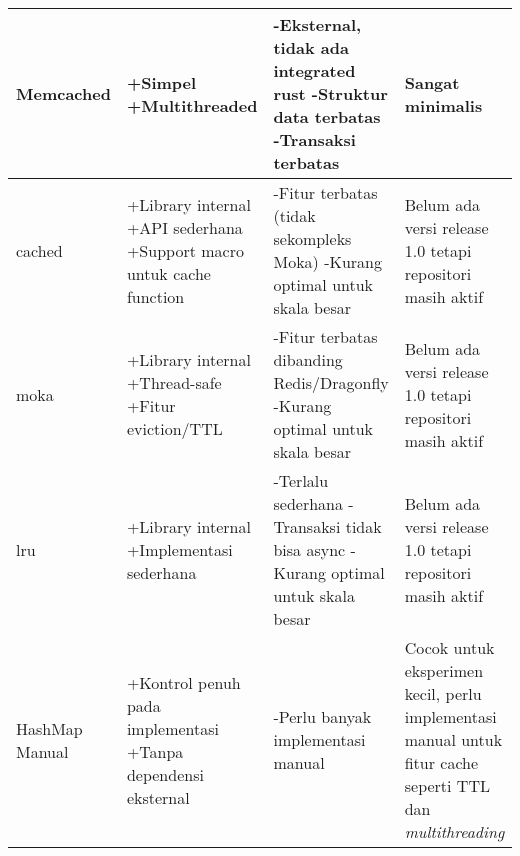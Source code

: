 \begin{table}[h]
{\begin{tabular}{|l|p{5cm}|p{5cm}|p{3cm}|}
			Memcached                 & +Simpel \newline +Multithreaded                                                              & -Eksternal, tidak ada integrated rust \newline -Struktur data terbatas \newline -Transaksi terbatas                                                                          & Sangat minimalis                                                                                                  \\ \hline
			cached                    & +Library internal \newline +API sederhana \newline  +Support macro untuk cache function      & -Fitur terbatas (tidak sekompleks Moka) \newline -Kurang optimal untuk skala besar                                                                                           & Belum ada versi release 1.0 tetapi repositori masih aktif                                                         \\ \hline
			moka                      & +Library internal \newline +Thread-safe \newline +Fitur eviction/TTL                         & -Fitur terbatas dibanding Redis/Dragonfly \newline -Kurang optimal untuk skala besar                                                                                         & Belum ada versi release 1.0 tetapi repositori masih aktif                                                         \\ \hline
			lru                       & +Library internal \newline +Implementasi sederhana                                           & -Terlalu sederhana \newline -Transaksi tidak bisa async \newline -Kurang optimal untuk skala besar                                                                           & Belum ada versi release 1.0 tetapi repositori masih aktif                                                         \\ \hline
			HashMap Manual            & +Kontrol penuh pada implementasi \newline +Tanpa dependensi eksternal                        & -Perlu banyak implementasi manual                                                                                                                                            & Cocok untuk eksperimen kecil, perlu implementasi manual untuk fitur cache seperti TTL dan \textit{multithreading} \\ \hline
		\end{tabular}
	}
	\label{tab:tools-kv}
\end{table}

